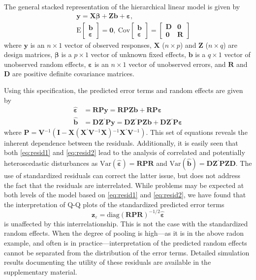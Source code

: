 \documentclass[12pt]{article} %
\newcommand{\inv}{\ensuremath{^{-1}}}
\newcommand{\trans}{\ensuremath{^\prime}}
\newcommand{\E}{\ensuremath{\mathrm{E}}}
\newcommand{\var}{\ensuremath{\mathrm{Var}}}
\newcommand{\cov}{\ensuremath{\mathrm{Cov}}}
\begin{document}
The general stacked representation of the hierarchical linear model is given by
%
\begin{eqnarray}\label{eq:hlm}
 && \bm{y} = \bm{X \beta} + \bm{Z b} + \bm{\varepsilon}, \\ \nonumber
 && \E \begin{bmatrix} \bm{b} \\ \bm{\varepsilon} \end{bmatrix} = \bm{0}, 
 \ \cov \begin{bmatrix} \bm{b} \\ \bm{\varepsilon} \end{bmatrix} = 
  	\begin{bmatrix} \bm{D} & \bm{0}\\ \bm{0} & \bm{R} \end{bmatrix}
\end{eqnarray}
%
where $\bm{y}$ is an $n \times 1$ vector of observed responses, $\bm{X}$ ($n \times p$) and $\bm{Z}$ ($n \times q$) are design matrices, $\bm{\beta}$ is a $p \times 1$ vector of unknown fixed effects, $\bm{b}$ is a $q \times 1$ vector of unobserved random effects, $\bm{\varepsilon}$ is an $n \times 1$ vector of unobserved errors, and $\bm{R}$ and $\bm{D}$ are positive definite covariance matrices.

Using this specification, the predicted error terms and random effects are given by 
%
\begin{align}
\widehat{\bm{\varepsilon}} &= \bm{RPy} = \bm{RPZb} + \bm{RP \varepsilon} \label{eq:resid1}\\
\widehat{\bm{b}} &= \bm{DZ}\trans \bm{Py} = \bm{DZ}\trans \bm{PZb} + \bm{DZ}\trans \bm{P \varepsilon} \label{eq:resid2}
\end{align}
%
where $\bm{P} = \bm{V}\inv( \bm{I} - \bm{X} (\bm{X}\trans \bm{V}\inv \bm{X})\inv \bm{X}\trans \bm{V}\inv)$. This  set of equations %
reveals the inherent dependence between the residuals.
Additionally, it is easily seen that both \eqref{eq:resid1} and \eqref{eq:resid2} lead to the analysis of correlated and potentially heteroscedastic disturbances as $\var(\widehat{\bm{\varepsilon}}) = \bm{RPR}$ and $\var(\widehat{\bm{b}}) = \bm{DZ}\trans \bm{PZD}$.
The use of standardized residuals can correct the latter issue, but does not address the fact that the residuals are interrelated. While problems may be expected at both levels of the model based on \eqref{eq:resid1} and \eqref{eq:resid2}, we have found that the interpretation of Q-Q plots of the standardized predicted error terms
%
\[
\bm{z}_{\varepsilon} =  \text{diag} \left(\bm{RPR} \right)^{-1/2} \widehat{\bm{\varepsilon}}
\]
%
is unaffected by this interrelationship. This is not the case with the standardized random effects.  When the degree of pooling is high---as it is in the above radon example, and often is in practice---interpretation of the predicted random effects cannot be separated from the distribution of the error terms. Detailed simulation results documenting the utility of  these residuals are available in the supplementary material.
\end{document}
